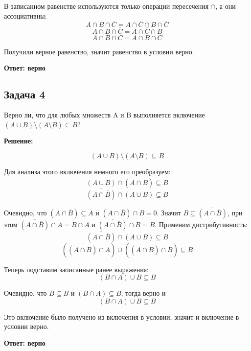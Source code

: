 \documentclass[a4paper,14pt]{article} %
\begin{document}
В записанном равенстве используются только операции пересечения $\cap$, а они ассоциативны:
\[A\cap B\cap \overline{C} = A\cap \overline{C} \cap B\cap \overline{C} \]
\[A\cap B\cap \overline{C} = A\cap \overline{C} \cap B \]
\[A\cap B\cap \overline{C} = A\cap B \cap \overline{C} \]

Получили верное равенство, значит равенство в условии верно.

\begin{flushright}
\begin{large}
\textbf {Ответ: верно}
\end{large}
\end{flushright}

\newpage
\begin{center}
\subsection{Задача 4}
\end{center}

Верно ли, что для любых множеств A и B выполняется включение $(A \cup B) \setminus (A \setminus B) \subseteq B$?
\begin{center}
\bfseries
{\Large Решение: }
\end{center}


\[(A \cup B) \setminus (A \setminus B) \subseteq B\]

Для анализа этого включения немного его преобразуем:
\[(A \cup B) \cap \overline{(A \cap \overline{B})} \subseteq B\]
\[\overline{(A \cap \overline{B})} \cap (A \cup B)  \subseteq B\]

Очевидно, что $(A \cap \overline{B}) \subseteq A$ и $(A \cap \overline{B}) \cap B =0$. Значит $B\subseteq\overline{(A \cap \overline{B})}$, при этом $\overline{(A \cap \overline{B})} \cap A = B \cap A$ и $\overline{(A \cap \overline{B})} \cap B = B $. Применим дистрибутивность:
\[\overline{(A \cap \overline{B})} \cap (A \cup B)  \subseteq B\]
\[(\overline{(A \cap \overline{B})} \cap A) \cup (\overline{(A \cap \overline{B})} \cap B)  \subseteq B\]

Теперь подставим записанные ранее выражения:
\[(B \cap A) \cup B  \subseteq B\]

Очевидно, что $B\subseteq B$ и $(B \cap A)\subseteq B$, тогда верно и
\[(B \cap A) \cup B  \subseteq B\]

Это включение было получено из включения в условии, значит и включение в условии верно.
\begin{flushright}
\begin{large}
\textbf {Ответ: верно}
\end{large}
\end{flushright}
\end{document}

